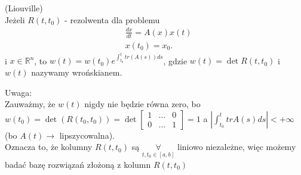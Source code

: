 \documentclass[../main.tex]{subfiles}
\begin{document}
\begin{tw}
    (Liouville)\\
    Jeżeli $R(t,t_0)$ - rezolwenta dla problemu
    \begin{align*}
        &\frac{dx}{dt} = A(x)x(t)\\
        &x(t_0) = x_0
    .\end{align*}
    i $x\in \mathbb{R}^n$, to $w(t) = w(t_0)e^{\int_{t_0}^t tr(A(s))ds}$, gdzie $w(t) = \det R(t,t_0)$ i $w(t)$ nazywamy wrońskianem.\\
\end{tw}
    Uwaga:\\
        Zauważmy, że $w(t)$ nigdy nie będzie równa zero, bo $w(t_0) = \det(R(t_0,t_0)) = \det \begin{bmatrix} 1&\ldots&0\\0&\ldots&1 \end{bmatrix} = 1$ a $\left| \int_{t_0}^t tr A(s)ds \right| < +\infty$ (bo $A(t)\to$ lipszycowalna).\\
        Oznacza to, że kolumny $R(t,t_0)$ są $\underset{t,t_0\in [a,b]}{\forall} $ liniowo niezależne, więc możemy badać bazę rozwiązań złożoną z kolumn $R(t,t_0)$
\end{document}
